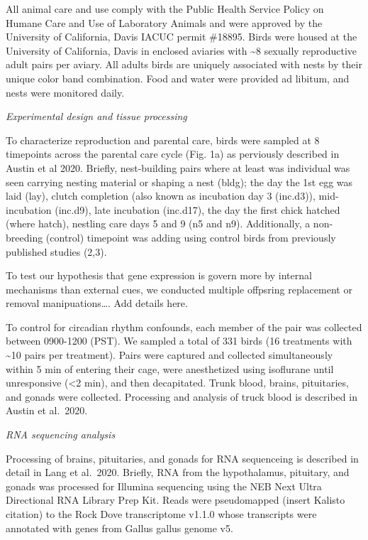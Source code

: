 All animal care and use comply with the Public Health Service Policy on
Humane Care and Use of Laboratory Animals and were approved by the
University of California, Davis IACUC permit \#18895. Birds were housed
at the University of California, Davis in enclosed aviaries with
\textasciitilde{}8 sexually reproductive adult pairs per aviary. All
adults birds are uniquely associated with nests by their unique color
band combination. Food and water were provided ad libitum, and nests
were monitored daily.

\emph{Experimental design and tissue processing}

To characterize reproduction and parental care, birds were sampled at 8
timepoints across the parental care cycle (Fig. 1a) as perviously
described in Austin et al 2020. Briefly, nest-building pairs where at
least was individual was seen carrying nesting material or shaping a
nest (bldg); the day the 1st egg was laid (lay), clutch completion (also
known as incubation day 3 (inc.d3)), mid-incubation (inc.d9), late
incubation (inc.d17), the day the first chick hatched (where hatch),
nestling care days 5 and 9 (n5 and n9). Additionally, a non-breeding
(control) timepoint was adding using control birds from previously
published studies (2,3).

To test our hypothesis that gene expression is govern more by internal
mechanisms than external cues, we conducted multiple offpsring
replacement or removal manipuations\ldots{}. Add details here.

To control for circadian rhythm confounds, each member of the pair was
collected between 0900-1200 (PST). We sampled a total of 331 birds (16
treatments with \textasciitilde{}10 pairs per treatment). Pairs were
captured and collected simultaneously within 5 min of entering their
cage, were anesthetized using isoflurane until unresponsive
(\textless{}2 min), and then decapitated. Trunk blood, brains,
pituitaries, and gonads were collected. Processing and analysis of truck
blood is described in Austin et al.~2020.

\emph{RNA sequencing analysis}

Processing of brains, pituitaries, and gonads for RNA sequenceing is
described in detail in Lang et al.~2020. Briefly, RNA from the
hypothalamus, pituitary, and gonads was processed for Illumina
sequencing using the NEB Next Ultra Directional RNA Library Prep Kit.
Reads were pseudomapped (insert Kalisto citation) to the Rock Dove
transcriptome v1.1.0 whose transcripts were annotated with genes from
Gallus gallus genome v5.

